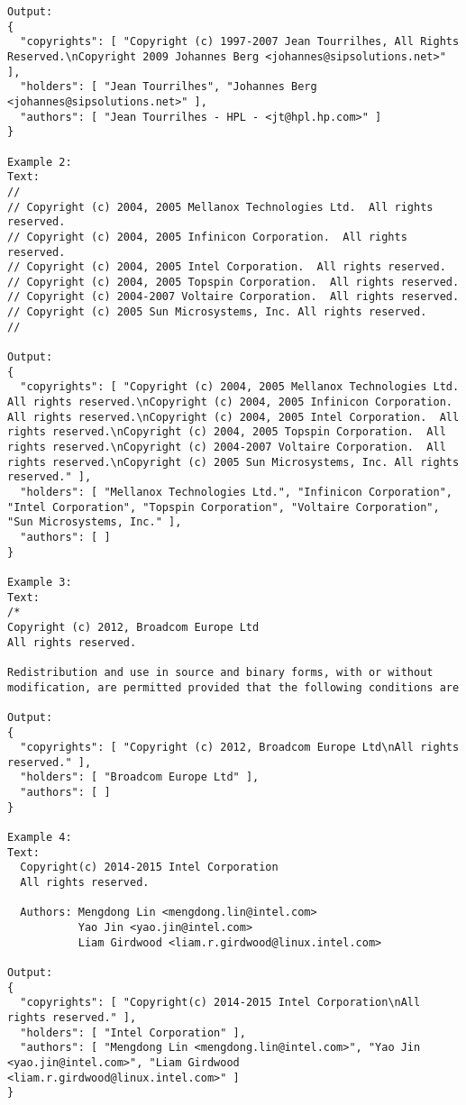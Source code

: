 \begin{lstlisting}[keepspaces=true]
Output:
{
  "copyrights": [ "Copyright (c) 1997-2007 Jean Tourrilhes, All Rights Reserved.\nCopyright	2009 Johannes Berg <johannes@sipsolutions.net>" ],
  "holders": [ "Jean Tourrilhes", "Johannes Berg <johannes@sipsolutions.net>" ],
  "authors": [ "Jean Tourrilhes - HPL - <jt@hpl.hp.com>" ]
}

Example 2:
Text:
//
// Copyright (c) 2004, 2005 Mellanox Technologies Ltd.  All rights reserved.
// Copyright (c) 2004, 2005 Infinicon Corporation.  All rights reserved.
// Copyright (c) 2004, 2005 Intel Corporation.  All rights reserved.
// Copyright (c) 2004, 2005 Topspin Corporation.  All rights reserved.
// Copyright (c) 2004-2007 Voltaire Corporation.  All rights reserved.
// Copyright (c) 2005 Sun Microsystems, Inc. All rights reserved.
//

Output:
{
  "copyrights": [ "Copyright (c) 2004, 2005 Mellanox Technologies Ltd.  All rights reserved.\nCopyright (c) 2004, 2005 Infinicon Corporation.  All rights reserved.\nCopyright (c) 2004, 2005 Intel Corporation.  All rights reserved.\nCopyright (c) 2004, 2005 Topspin Corporation.  All rights reserved.\nCopyright (c) 2004-2007 Voltaire Corporation.  All rights reserved.\nCopyright (c) 2005 Sun Microsystems, Inc. All rights reserved." ],
  "holders": [ "Mellanox Technologies Ltd.", "Infinicon Corporation", "Intel Corporation", "Topspin Corporation", "Voltaire Corporation", "Sun Microsystems, Inc." ],
  "authors": [ ]
}

Example 3:
Text:
/*
Copyright (c) 2012, Broadcom Europe Ltd
All rights reserved.

Redistribution and use in source and binary forms, with or without
modification, are permitted provided that the following conditions are

Output:
{
  "copyrights": [ "Copyright (c) 2012, Broadcom Europe Ltd\nAll rights reserved." ],
  "holders": [ "Broadcom Europe Ltd" ],
  "authors": [ ]
}

Example 4:
Text:
  Copyright(c) 2014-2015 Intel Corporation
  All rights reserved.

  Authors: Mengdong Lin <mengdong.lin@intel.com>
           Yao Jin <yao.jin@intel.com>
           Liam Girdwood <liam.r.girdwood@linux.intel.com>

Output:
{
  "copyrights": [ "Copyright(c) 2014-2015 Intel Corporation\nAll rights reserved." ],
  "holders": [ "Intel Corporation" ],
  "authors": [ "Mengdong Lin <mengdong.lin@intel.com>", "Yao Jin <yao.jin@intel.com>", "Liam Girdwood <liam.r.girdwood@linux.intel.com>" ]
}


\end{lstlisting}
